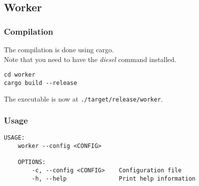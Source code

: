 \documentclass[../documentation.tex]{subfiles}
\begin{document}
\subsection{Worker}

\subsubsection{Compilation}

The compilation is done using cargo. \\
Note that you need to have the \textit{diesel} command installed.

\begin{lstlisting}[style=boxed, numbers=none]
cd worker
cargo build --release
\end{lstlisting}

The executable is now at \texttt{./target/release/worker}.

\subsubsection{Usage}

\begin{lstlisting}[style=boxed, numbers=none]
    USAGE:
    worker --config <CONFIG>

    OPTIONS:
        -c, --config <CONFIG>    Configuration file
        -h, --help               Print help information
\end{lstlisting}
\end{document}
